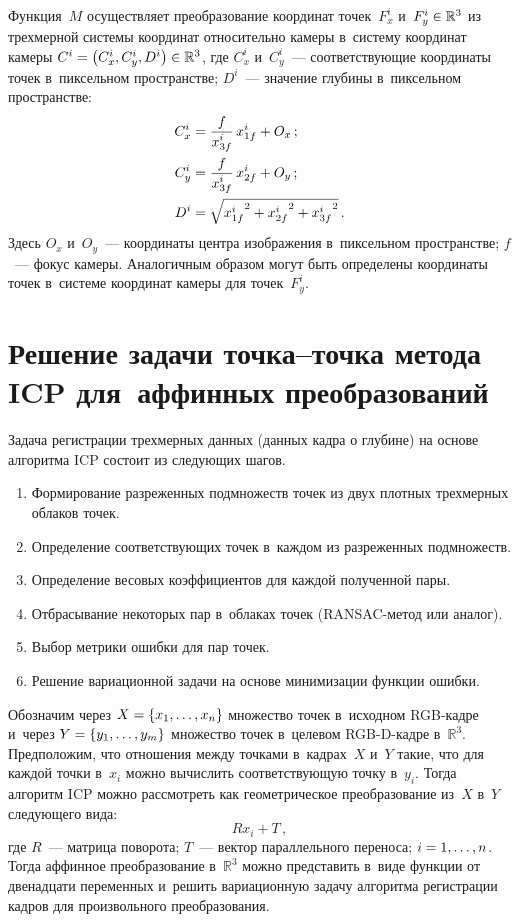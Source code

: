 \begin{multicols}{2}
  Функция~$M$ осуществляет преобразование координат точек~$F_x^i$ 
и~$F_y^i\hm\in \mathbb{R}^3$ из трехмерной сис\-те\-мы координат относительно 
камеры в~систему координат камеры $C^i\hm= \left( C_x^i, C_y^i, 
D^i\right)\hm\in \mathbb{R}^3$, где $C_x^i$ и~$C_y^i$~--- соответствующие 
координаты точек в~пиксельном пространстве; $D^i$~--- значение глубины 
в~пиксельном про\-стран\-стве:
  \begin{align*}
  C_x^i&=\displaystyle\frac{\displaystyle f\mathstrut}{\displaystyle x^i_{3f}\mathstrut}\,x^i_{1f}+O_x\,;\\
  C_y^i&=\displaystyle\frac{\displaystyle f\mathstrut}{\displaystyle x^i_{3f}\mathstrut}\,x^i_{2f}+O_y\,;\\
  D^i&=\sqrt{{x^i_{1f}}^2 +{x^i_{2f}}^2+{x^i_{3f}}^2}\,.
  \end{align*}
 Здесь $O_x$ и~$O_y$~--- координаты центра изображения в~пиксельном 
пространстве; $f$~--- фокус камеры. Аналогичным образом могут быть 
определены координаты точек в~сис\-те\-ме координат камеры для точек~$F_y^i$.

\section{Решение задачи точка--точка метода ICP для~аффинных 
преобразований}

  Задача регистрации трехмерных данных (данных кадра о глубине) на основе 
алгоритма ICP со\-сто\-ит из следующих шагов.
  \begin{enumerate}[1.]
\item Формирование разреженных подмножеств точек из двух плот\-ных 
трехмерных облаков точек.
\item Определение соответствующих точек в~каждом из разреженных 
подмножеств.
\item Определение весовых коэффициентов для каж\-дой полученной пары.
\item Отбрасывание некоторых пар в~облаках точек (RANSAC-ме\-тод или 
аналог).
\item Выбор метрики ошибки для пар точек.
\item Решение вариационной задачи на основе минимизации функции ошибки.
\end{enumerate}
  
  Обозначим через $X\hm=\{x_1, \ldots , x_n\}$ множество точек в~исходном 
RGB-кадре и~через $Y\hm= \{ y_1, \ldots , y_m\}$ множество точек в~целевом 
RGB-D-кад\-ре в~$\mathbb{R}^3$. Предположим, что отношения между 
точками в~кадрах~$X$ и~$Y$ такие, что для каждой точки в~$x_i$ можно 
вычислить со\-от\-вет\-ст\-ву\-ющую точ\-ку в~$y_i$. Тогда алгоритм ICP можно 
рассмотреть как гео\-мет\-ри\-че\-ское преобразование из~$X$ в~$Y$ сле\-ду\-юще\-го 
вида:
  \begin{equation*}
  Rx_i+T\,,
  \end{equation*}
где $R$~--- матрица поворота; $T$~--- вектор параллельного переноса; 
$i\hm=1,\ldots , n$. Тогда аффинное преобра\-зо\-ва\-ние в~$\mathbb{R}^3$ можно 
представить в~виде функции от двенадцати переменных и~решить 
вариационную задачу алгоритма регистрации кад\-ров для произвольного 
преобразования. 


\end{multicols}
